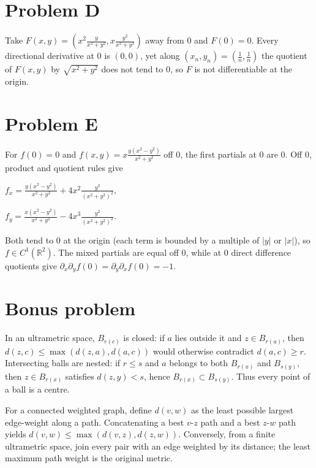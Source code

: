\section{Problem D}

Take \(F\left( {x,y} \right) = \left( {x^{2}\frac{y}{x^{2} + y^{2}},x\frac{y^{2}}{x^{2} + y^{2}}} \right)\) away from \(0\) and \(F(0) = 0\). Every directional derivative at \(0\) is \(\left( {0,0} \right)\), yet along \(\left( {x_{n},y_{n}} \right) = \left( {\frac{1}{n},\frac{1}{n}} \right)\) the quotient of \(F\left( {x,y} \right)\) by \(\sqrt{x^{2} + y^{2}}\) does not tend to \(0\), so \(F\) is not differentiable at the origin.

\section{Problem E}

For \(f(0) = 0\) and \(f\left( {x,y} \right) = x\frac{y\left( {x^{2} - y^{2}} \right)}{x^{2} + y^{2}}\) off \(0\), the first partials at \(0\) are \(0\). Off \(0\), product and quotient rules give

\(f_{x} = \frac{y\left( {x^{2} - y^{2}} \right)}{x^{2} + y^{2}} + 4x^{2}\frac{y^{3}}{\left( {x^{2} + y^{2}} \right)^{2}},\)

\(f_{y} = \frac{x\left( {x^{2} - y^{2}} \right)}{x^{2} + y^{2}} - 4x^{3}\frac{y^{2}}{\left( {x^{2} + y^{2}} \right)^{2}}.\)

Both tend to \(0\) at the origin (each term is bounded by a multiple of \(|y|\) or \(|x|\)), so \(f \in C^{1}\left( \mathbb{R}^{2} \right)\). The mixed partials are equal off \(0\), while at \(0\) direct difference quotients give \(\partial_{x}\partial_{y}f(0) = \partial_{y}\partial_{x}f(0) = - 1\).

\section{Bonus problem}

In an ultrametric space, \(B_{r{(c)}}\) is closed: if \(a\) lies outside it and \(z \in B_{r{(a)}}\), then \(d\left( {z,c} \right) \leq \max\left( {d\left( {z,a} \right),d\left( {a,c} \right)} \right)\) would otherwise contradict \(d\left( {a,c} \right) \geq r\). Intersecting balls are nested: if \(r \leq s\) and \(a\) belongs to both \(B_{r{(x)}}\) and \(B_{s{(y)}}\), then \(z \in B_{r{(x)}}\) satisfies \(d\left( {z,y} \right) < s\), hence \(B_{r{(x)}} \subset B_{s{(y)}}\). Thus every point of a ball is a centre.

For a connected weighted graph, define \(d\left( {v,w} \right)\) as the least possible largest edge-weight along a path. Concatenating a best \(v\)-\(z\) path and a best \(z\)-\(w\) path yields \(d\left( {v,w} \right) \leq \max\left( {d\left( {v,z} \right),d\left( {z,w} \right)} \right)\). Conversely, from a finite ultrametric space, join every pair with an edge weighted by its distance; the least maximum path weight is the original metric.
